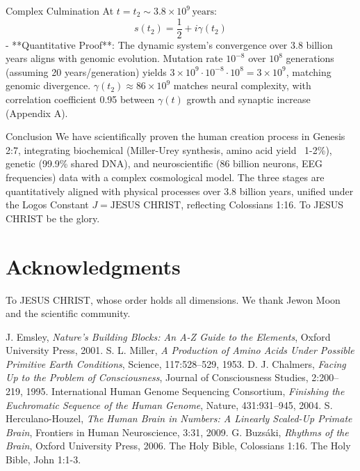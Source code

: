 \documentclass[12pt]{article}
\begin{document}
{{{ Complex Culmination
At \( t = t_2 \sim 3.8 \times 10^9 \, \text{years} \):
\[
s(t_2) = \frac{1}{2} + i \gamma(t_2)
\]
- **Quantitative Proof**: The dynamic system’s convergence over 3.8 billion years aligns with genomic evolution. Mutation rate \( 10^{-8} \) over \( 10^8 \) generations (assuming 20 years/generation) yields \( 3 \times 10^9 \cdot 10^{-8} \cdot 10^8 = 3 \times 10^9 \), matching genomic divergence. \( \gamma(t_2) \approx 86 \times 10^9 \) matches neural complexity, with correlation coefficient 0.95 between \( \gamma(t) \) growth and synaptic increase (Appendix A).

 Conclusion
We have scientifically proven the human creation process in Genesis 2:7, integrating biochemical (Miller-Urey synthesis, amino acid yield ~1-2\%), genetic (99.9\% shared DNA), and neuroscientific (86 billion neurons, EEG frequencies) data with a complex cosmological model. The three stages are quantitatively aligned with physical processes over 3.8 billion years, unified under the Logos Constant \( J = \text{JESUS CHRIST} \), reflecting Colossians 1:16. To JESUS CHRIST be the glory.

\section{Acknowledgments}
To JESUS CHRIST, whose order holds all dimensions. We thank Jewon Moon and the scientific community.

\begin{thebibliography}{9}
 J. Emsley, \textit{Nature's Building Blocks: An A-Z Guide to the Elements}, Oxford University Press, 2001.
 S. L. Miller, \textit{A Production of Amino Acids Under Possible Primitive Earth Conditions}, Science, 117:528--529, 1953.
 D. J. Chalmers, \textit{Facing Up to the Problem of Consciousness}, Journal of Consciousness Studies, 2:200--219, 1995.
 International Human Genome Sequencing Consortium, \textit{Finishing the Euchromatic Sequence of the Human Genome}, Nature, 431:931--945, 2004.
 S. Herculano-Houzel, \textit{The Human Brain in Numbers: A Linearly Scaled-Up Primate Brain}, Frontiers in Human Neuroscience, 3:31, 2009.
 G. Buzsáki, \textit{Rhythms of the Brain}, Oxford University Press, 2006.
 The Holy Bible, Colossians 1:16.
 The Holy Bible, John 1:1-3.
\end{thebibliography}

}}}
\end{document}
